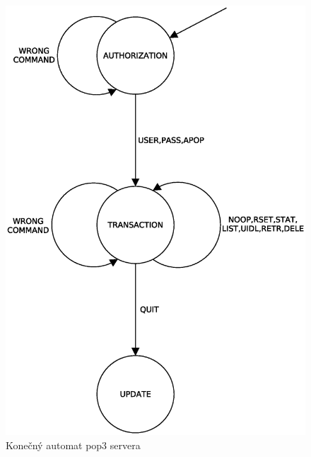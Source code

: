 \documentclass[11pt,a4paper]{article}
\begin{document}
\begin{figure}[h]
	\center
    \includegraphics[scale=0.5]{images/FSM}
    \caption{Konečný automat pop3 servera}
	\label{IMG-FSM}
\end{figure}

\newpage %

\makeatletter
\makeatother

\begin{flushleft}
	
\end{flushleft}
\end{document}
